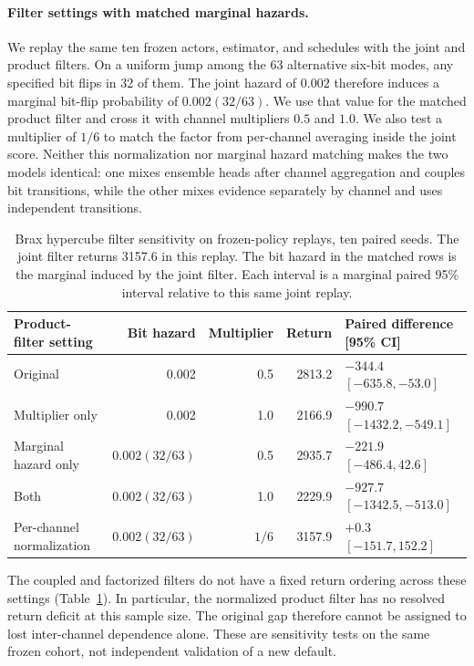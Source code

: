 \paragraph{Filter settings with matched marginal hazards.}
We replay the same ten frozen actors, estimator, and schedules with the joint and product filters. On a uniform jump among the 63 alternative six-bit modes, any specified bit flips in 32 of them. The joint hazard of \(0.002\) therefore induces a marginal bit-flip probability of \(0.002(32/63)\). We use that value for the matched product filter and cross it with channel multipliers \(0.5\) and \(1.0\). We also test a multiplier of \(1/6\) to match the factor from per-channel averaging inside the joint score. Neither this normalization nor marginal hazard matching makes the two models identical: one mixes ensemble heads after channel aggregation and couples bit transitions, while the other mixes evidence separately by channel and uses independent transitions.

\begin{table}[t]
\centering
\small
\caption{Brax hypercube filter sensitivity on frozen-policy replays, ten paired seeds. The joint filter returns 3157.6 in this replay. The bit hazard in the matched rows is the marginal induced by the joint filter. Each interval is a marginal paired 95\% interval relative to this same joint replay.}
\label{tab:brax_filter_replay}
\begin{tabular}{lrrrl}
\toprule
Product-filter setting & Bit hazard & Multiplier & Return & Paired difference [95\% CI] \\
\midrule
Original & 0.002 & 0.5 & 2813.2 & \(-344.4\) \([-635.8,-53.0]\) \\
Multiplier only & 0.002 & 1.0 & 2166.9 & \(-990.7\) \([-1432.2,-549.1]\) \\
Marginal hazard only & \(0.002(32/63)\) & 0.5 & 2935.7 & \(-221.9\) \([-486.4,42.6]\) \\
Both & \(0.002(32/63)\) & 1.0 & 2229.9 & \(-927.7\) \([-1342.5,-513.0]\) \\
Per-channel normalization & \(0.002(32/63)\) & \(1/6\) & 3157.9 & \(+0.3\) \([-151.7,152.2]\) \\
\bottomrule
\end{tabular}
\end{table}

The coupled and factorized filters do not have a fixed return ordering across these settings (Table~\ref{tab:brax_filter_replay}). In particular, the normalized product filter has no resolved return deficit at this sample size. The original gap therefore cannot be assigned to lost inter-channel dependence alone. These are sensitivity tests on the same frozen cohort, not independent validation of a new default.

